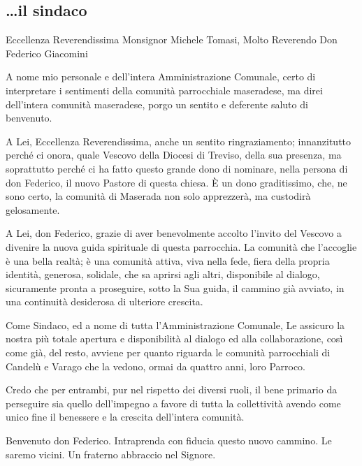 \subsection{\dots il sindaco}


Eccellenza Reverendissima Monsignor Michele Tomasi, Molto Reverendo Don Federico Giacomini

A nome mio personale e dell'intera Amministrazione Comunale, certo di interpretare i sentimenti della comunità parrocchiale maseradese, ma direi dell'intera comunità maseradese, porgo un sentito e deferente saluto di benvenuto.

A Lei, Eccellenza Reverendissima, anche un sentito ringraziamento; innanzitutto perché ci onora, quale Vescovo della Diocesi di Treviso, della sua presenza, ma soprattutto perché ci ha fatto questo grande dono di nominare, nella persona di don Federico, il nuovo Pastore di questa chiesa. È un dono graditissimo, che, ne sono certo, la comunità di Maserada non solo apprezzerà, ma custodirà gelosamente.

A Lei, don Federico, grazie di aver benevolmente accolto l'invito del Vescovo a divenire la nuova guida spirituale di questa parrocchia. La comunità che l'accoglie è una bella realtà; è una comunità attiva, viva nella fede, fiera della propria identità, generosa, solidale, che sa aprirsi agli altri, disponibile al dialogo, sicuramente pronta a proseguire, sotto la Sua guida, il cammino già avviato, in una continuità desiderosa di ulteriore crescita.

Come Sindaco, ed a nome di tutta l'Amministrazione Comunale, Le assicuro la nostra più totale apertura e disponibilità al dialogo ed alla collaborazione, così come già, del resto, avviene per quanto riguarda le comunità parrocchiali di Candelù e Varago che la vedono, ormai da quattro anni, loro Parroco.

Credo che per entrambi, pur nel rispetto dei diversi ruoli, il bene primario da perseguire sia quello dell'impegno a favore di tutta la collettività avendo come unico fine il benessere e la crescita dell'intera comunità.

Benvenuto don Federico. Intraprenda con fiducia questo nuovo cammino. Le saremo vicini. Un fraterno abbraccio nel Signore.

